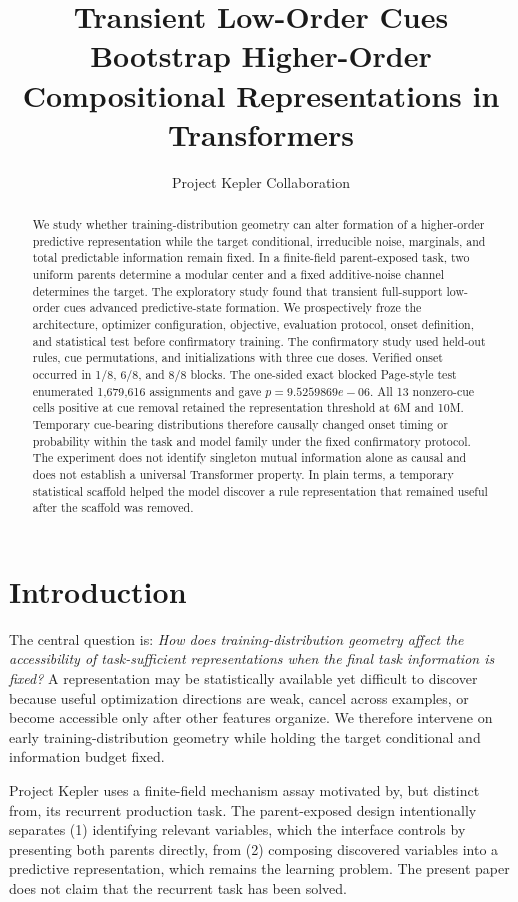\documentclass[11pt]{article}
\title{Transient Low-Order Cues Bootstrap Higher-Order Compositional Representations in Transformers}
\author{Project Kepler Collaboration}
\date{}
\begin{document}
\maketitle

\begin{abstract}
We study whether training-distribution geometry can alter formation of a
higher-order predictive representation while the target conditional,
irreducible noise, marginals, and total predictable information remain fixed.
In a finite-field parent-exposed task, two uniform parents determine a modular
center and a fixed additive-noise channel determines the target. The
exploratory study found that transient full-support low-order cues advanced
predictive-state formation. We prospectively froze the architecture,
optimizer configuration, objective, evaluation protocol, onset definition,
and statistical test before confirmatory training. The confirmatory study used
held-out rules, cue permutations, and initializations with three cue doses.
Verified onset occurred in 1/8,
6/8, and 8/8 blocks. The
one-sided exact blocked Page-style test enumerated
1,679,616 assignments and gave
$p=9.5259869e-06$. All 13 nonzero-cue cells
positive at cue removal retained the representation threshold at 6M and 10M.
Temporary cue-bearing distributions therefore causally changed onset timing or
probability within the task and model family under the fixed confirmatory
protocol. The experiment does not
identify singleton mutual information alone as causal and does not establish a
universal Transformer property. In plain terms, a temporary statistical
scaffold helped the model discover a rule representation that remained useful
after the scaffold was removed.
\end{abstract}

\section{Introduction}
The central question is: \emph{How does training-distribution geometry affect
the accessibility of task-sufficient representations when the final task
information is fixed?} A representation may be statistically available yet
difficult to discover because useful optimization directions are weak, cancel
across examples, or become accessible only after other features organize. We
therefore intervene on early training-distribution geometry while holding the
target conditional and information budget fixed.

Project Kepler uses a finite-field mechanism assay motivated by, but distinct
from, its recurrent production task. The parent-exposed design intentionally
separates (1) identifying relevant variables, which the interface controls by
presenting both parents directly, from (2) composing discovered variables into
a predictive representation, which remains the learning problem. The present
paper does not claim that the recurrent task has been solved.
\end{document}

